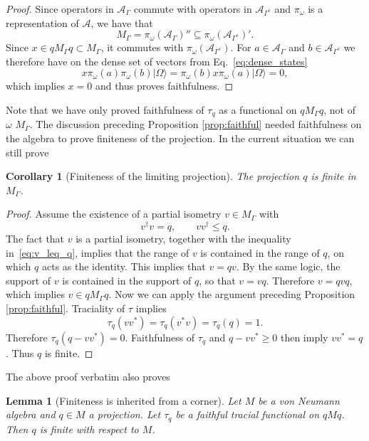 \documentclass[aps,pra,reprint,superscriptaddress]{revtex4-2}
\newcommand{\cA}{{\mathcal A}}
\newcommand\G{\Gamma}
\renewcommand\t{\tau}
\newcommand\w{\omega}
\newcommand\W{\Omega}
\providecommand{\ket}[1]{\lvert #1\rangle}
\newtheorem{lemma}[theorem]{Lemma}
\newtheorem{corollary}[theorem]{Corollary}
\theoremstyle{definition}
\theoremstyle{remark}
\begin{document}
\begin{proof}
Since operators in $\cA_\G$ commute with operators in $\cA_{\G^c}$ and $\pi_\w$
is a representation of $\cA$, we have that
\begin{equation}
  M_\G
  =\pi_\omega(\cA_\G)''
  \subseteq
  \pi_\omega(\cA_{\G^c})'.
  \label{eq:M-commutes-complement}
\end{equation}
Since $x \in q M_\G q \subset M_\G$, it commutes with
$\pi_\omega( \cA_{\G^c})$.  For $a\in \cA_\G$ and $b\in \cA_{\G^c} $ we
therefore have on the dense set of vectors from Eq.~\eqref{eq:dense_states}
\begin{equation} \label{eq:x_global_annihilation}
  x\pi_\omega(a)\pi_\omega(b)\ket{\W}
  =\pi_\omega(b)x\pi_\omega(a)\ket{\W} = 0,
\end{equation}
which implies $x = 0$ and thus proves faithfulness.
\end{proof}
Note that we have only proved faithfulness of $\t_q$ as a functional on $qM_\G
q$, not of $\w$ $M_\G$. The discussion preceding Proposition
\ref{prop:faithful} needed faithfulness on the algebra to prove finiteness of
the projection. In the current situation we can still prove
\begin{corollary}[Finiteness of the limiting projection]\label{cor:q_finite}
The projection $q$ is finite in $M_\G$.
\end{corollary}

\begin{proof}
Assume the existence of a partial isometry $v\in M_\G$ with
\begin{equation}\label{eq:v_leq_q}
  v^\dagger v=q,
  \qquad
  vv^\dagger \leq q.
\end{equation}
The fact that $v$ is a partial isometry, together with the inequality in~\eqref{eq:v_leq_q}, implies that the range
of $v$ is contained in the range of $q$, on which $q$ acts as the identity. 
This implies that $v = qv$. 
By the same logic, the support of $v$ is contained in the support of $q$, so
that $v = vq$. Therefore $v = qvq$, which implies $v \in q M_\G q$.
Now we can apply the argument preceding Proposition \ref{prop:faithful}.
Traciality of $\t$ implies
\begin{equation}
  \tau_q(vv^*)=\tau_q(v^*v)=\tau_q(q)=1.
\end{equation}
Therefore $\tau_q(q-vv^*)=0$. Faithfulness of $\t_q$ and $q-vv^*\ge 0$ then
imply $vv^*=q$.  Thus $q$ is finite.
\end{proof}
The above proof verbatim also proves
\begin{lemma}[Finiteness is inherited from a corner]\label{lem:finite_corner_finite_global}
    Let $M$ be a von Neumann algebra and $q \in M$ a projection. Let $\t_q$ be a
    faithful tracial functional on $q M q$. Then $q$ is finite with respect to $M$.
\end{lemma}
\end{document}

